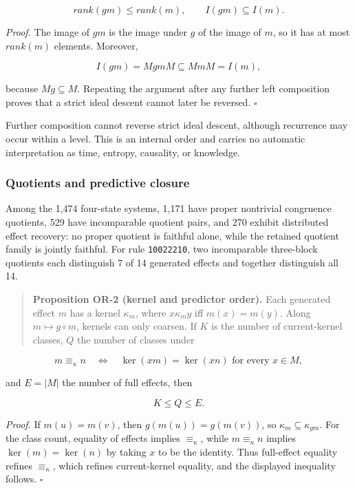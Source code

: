 \documentclass[11pt,a4paper]{article}
\begin{document}
\[rank(gm) \leq rank(m),\quad\quad I(gm) \subseteq I(m).\]

\emph{Proof.} The image of \(gm\) is the image under \(g\) of the image
of \(m\), so it has at most \(rank(m)\) elements. Moreover,

\[I(gm) = MgmM \subseteq MmM = I(m),\]

because \(Mg \subseteq M\). Repeating the argument after any further
left composition proves that a strict ideal descent cannot later be
reversed. \(\ensuremath{\square}\)

Further composition cannot reverse strict ideal descent, although
recurrence may occur within a level. This is an internal order and
carries no automatic interpretation as time, entropy, causality, or
knowledge.

\subsubsection{Quotients and predictive
closure}

Among the 1,474 four-state systems, 1,171 have proper nontrivial
congruence quotients, 529 have incomparable quotient pairs, and 270
exhibit distributed effect recovery: no proper quotient is faithful
alone, while the retained quotient family is jointly faithful. For rule
\texttt{1002\textbar{}2210}, two incomparable three-block quotients each
distinguish 7 of 14 generated effects and together distinguish all 14.

\begin{quote}
\textbf{Proposition OR-2 (kernel and predictor order).} Each generated
effect \(m\) has a kernel \(\kappa_{m}\), where \(x\kappa_{m}y\) iff
\(m(x) = m(y)\). Along \(m \mapsto g \circ m\), kernels can only
coarsen. If \(K\) is the number of current-kernel classes, \(Q\) the
number of classes under
\end{quote}

\[m \equiv_{\kappa}n\quad \Leftrightarrow \quad\ker(xm) = \ker(xn)\text{ for every }x \in M,\]

and \(E = |M|\) the number of full effects, then

\[K \leq Q \leq E.\]

\emph{Proof.} If \(m(u) = m(v)\), then
\(g\left( m(u) \right) = g\left( m(v) \right)\), so
\(\kappa_{m} \subseteq \kappa_{gm}\). For the class count, equality of
effects implies \(\equiv_{\kappa}\), while \(m \equiv_{\kappa}n\)
implies \(\ker(m) = \ker(n)\) by taking \(x\) to be the identity. Thus
full-effect equality refines \(\equiv_{\kappa}\), which refines
current-kernel equality, and the displayed inequality follows. \(\ensuremath{\square}\)
\end{document}
